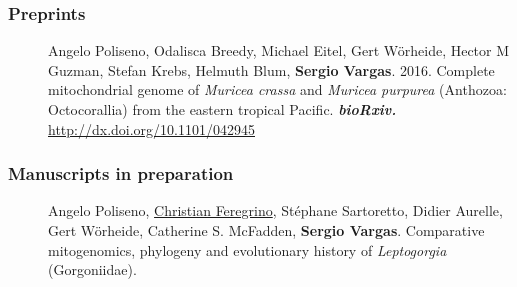 \documentclass[letter,10pt]{article}
\begin{document}
\subsubsection*{Preprints}
\begin{description}
  \item[]Angelo Poliseno, Odalisca Breedy, Michael Eitel, Gert W\"orheide, Hector M Guzman, Stefan Krebs, Helmuth Blum, \textbf{Sergio Vargas}. 2016. Complete mitochondrial genome of \emph{Muricea crassa} and \emph{Muricea purpurea} (Anthozoa: Octocorallia) from the eastern tropical Pacific. \textbf{\emph{bioRxiv.}} \href{http://dx.doi.org/10.1101/042945}{http://dx.doi.org/10.1101/042945}


\end{description}

\subsubsection*{Manuscripts in preparation}
\begin{description}



\item[]Angelo Poliseno, \underline{Christian Feregrino}, St\'ephane Sartoretto, Didier Aurelle, Gert W\"orheide, Catherine S. McFadden, \textbf{Sergio Vargas}. Comparative mitogenomics, phylogeny and evolutionary history of \emph{Leptogorgia} (Gorgoniidae).

\end{description}
\end{document}
